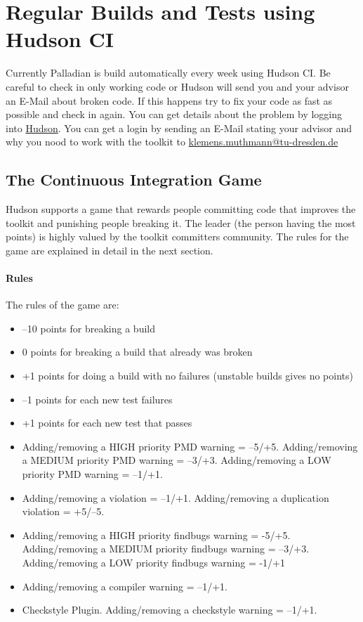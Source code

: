 \documentclass[a4paper,twoside]{book}      %
\begin{document}
\section{Regular Builds and Tests using Hudson CI}
Currently Palladian is build automatically every week using Hudson CI. Be careful to check in only working code or Hudson will send you and your advisor an E-Mail about broken code. If this happens try to fix your code as fast as possible and check in again. You can get details about the problem by logging into \href{http://www.effingo.de/hudson}{Hudson}. You can get a login by sending an E-Mail stating your advisor and why you nood to work with the toolkit to \href{mailto:klemens.muthmann@tu-dresden.de}{klemens.muthmann@tu-dresden.de}
\subsection{The Continuous Integration Game}
\label{sec:cigame}
Hudson supports a game that rewards people committing code that improves the toolkit and punishing people breaking it. The leader (the person having the most points) is highly valued by the toolkit committers community. The rules for the game are explained in detail in the next section.
\paragraph{Rules}
The rules of the game are:
\begin{itemize}
\item --10 points for breaking a build
\item 0 points for breaking a build that already was broken
\item +1 points for doing a build with no failures (unstable builds gives no points)
\item --1 points for each new test failures
\item +1 points for each new test that passes
\item Adding/removing a HIGH priority PMD warning = --5/+5. Adding/removing a MEDIUM priority PMD warning = --3/+3. Adding/removing a LOW priority PMD warning = --1/+1.
\item Adding/removing a violation = --1/+1. Adding/removing a duplication violation = +5/--5.
\item Adding/removing a HIGH priority findbugs warning = -5/+5. Adding/removing a MEDIUM priority findbugs warning = --3/+3. Adding/removing a LOW priority findbugs warning = -1/+1
\item Adding/removing a compiler warning = --1/+1.
\item Checkstyle Plugin. Adding/removing a checkstyle warning = --1/+1.
\end{itemize}
\end{document}
